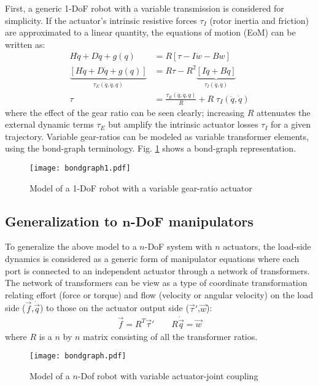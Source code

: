 First, a generic 1-DoF robot with a variable transmission is considered for simplicity. If the actuator's intrinsic resistive forces $\tau_I$ (rotor inertia and friction) are approximated to a linear quantity, the equations of motion (EoM) can be written as:
%
\begin{align}
  H \ddot{q} + D \dot{q} + g( q )	&= R  \left[ \tau - I \dot{w} - B w	\right] \\
	\underbrace{\left[	H \ddot{q} + D \dot{q} + g( q )	\right]}_{\tau_{E}(\ddot{q},\dot{q},q)}
	&= R \tau - R^2
	\underbrace{\left[ I \ddot{q} + B \dot{q}	\right]}_{\tau_{I}(\ddot{q},\dot{q})} \\
	\tau &= 	\frac{\tau_{E}(\ddot{q},\dot{q},q)}{R} + R \; \tau_{I}(\ddot{q},\dot{q})
	\label{eq:1dofEoM}
\end{align}
%
where the effect of the gear ratio can be seen clearly; increasing $R$ attenuates the external dynamic terms $\tau_{E}$ but amplify the intrinsic actuator losses $\tau_{I}$ for a given trajectory.
%
Variable gear-ratios can be modeled as variable transformer elements, using the bond-graph terminology. Fig. \ref{fig:bondgraph1} shows a bond-graph representation.
%
\begin{figure}[htp]
	\centering
		\texttt{[image: bondgraph1.pdf]}
	\caption{Model of a 1-DoF robot with a variable gear-ratio actuator}
	\label{fig:bondgraph1}
\end{figure}


\subsection{Generalization to $\boldsymbol{n}$-DoF manipulators}
\label{sec:GeneralizationToNDOFManipulators}

To generalize the above model to a $n$-DoF system with $n$ actuators, the load-side dynamics is considered as a generic form of manipulator equations where each port is connected to an independent actuator through a network of transformers. The network of transformers can be view as a type of coordinate transformation relating effort (force or torque) and flow (velocity or angular velocity) on the load side ($\vec{f}$,$\dot{\vec{q}}$) to those on the actuator output side ($\vec{\tau}'$,$\vec{w}$):
%
\begin{align}
	\vec{ f } = R^T \vec{\tau}' \quad  \quad R \dot{ \vec{q} } = \vec{w}
 \label{eq:coortransform}
\end{align}
%
where $R$ is a $n$ by $n$ matrix consisting of all the transformer ratios. 
%
\begin{figure}[htp]
	\centering
		\texttt{[image: bondgraph.pdf]}
	\caption{Model of a $n$-Dof robot with variable actuator-joint coupling}
	\label{fig:bondgraph}
\end{figure}

